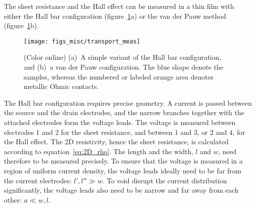 The sheet resistance and the Hall effect can be measured in a thin film with either the Hall bar configuration (figure~\ref{fig:transport_meas}a) or the van der Pauw method (figure~\ref{fig:transport_meas}b).%
\begin{figure}[ht]%
	\centering%
    \texttt{[image: figs\_misc/transport\_meas]}%
    \caption[A Hall bar and a van der Pauw pattern]{\label{fig:transport_meas}(Color online) (a)~A simple variant of the Hall bar configuration, and (b)~a van der Pauw configuration. The blue shape denote the samples, whereas the numbered or labeled orange area denotes metallic Ohmic contacts.}%
\end{figure}%

The Hall bar configuration requires precise geometry. A current is passed between the source and the drain electrodes, and the narrow branches together with the attached electrodes form the voltage leads. The voltage is measured between electrodes 1 and 2 for the sheet resistance, and between 1 and 3, or 2 and 4, for the Hall effect. The 2D resistivity, hence the sheet resistance, is calculated according to equation~\ref{eq:2D_rho}. The length and the width, $l$ and $w$, need therefore to be measured precisely. To ensure that the voltage is measured in a region of uniform current density, the voltage leads ideally need to be far from the current electrodes: $l', l'' \gg w$. To void disrupt the current distribution significantly, the voltage leads also need to be narrow and far away from each other: $a \ll w, l$.

